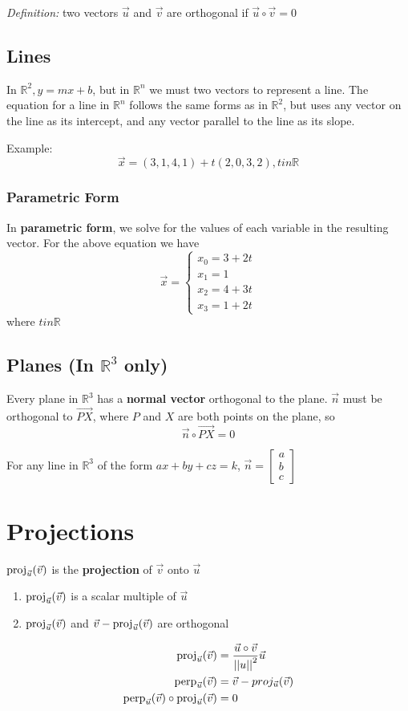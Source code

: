 \documentclass[12pt]{article}
\newcommand{\perpp}[2]{{\rm perp}_{\vec{#2}} (\vec{#1})}
\newcommand{\proj}[2]{{\rm proj}_{\vec{#2}} (\vec{#1})}
\newcommand{\R}[1]{\mathbb{R}^{#1}}
\newcommand{\vecthree}[3]{\begin{bmatrix}#1\\#2\\#3\end{bmatrix}}
\begin{document}
\textit{Definition:} two vectors $\vec{u}$ and $\vec{v}$ are orthogonal if $\vec{u}\circ\vec{v} = 0$

\subsection*{Lines}
In $\R{2}, y = mx + b$, but in $\R{n}$ we must two vectors to represent a line. The equation for a line in $\R{n}$ follows the same forms as in $\R{2}$, but uses any vector on the line as its intercept, and any vector parallel to the line as its slope.

Example: \[ \vec{x} = (3,1,4,1) + t(2,0,3,2), tin\mathbb{R} \]

\subsubsection*{Parametric Form}
In {\bf parametric form}, we solve for the values of each variable in the resulting vector. For the above equation we have
\[ \vec{x} =
  \begin{cases}
   x_0 = 3 + 2t\\
   x_1 = 1\\
   x_2 = 4 + 3t\\
   x_3 = 1 + 2t
  \end{cases}
\]
where $tin\mathbb{R}$

\subsection*{Planes (In $\R{3}$ only)}
Every plane in $\R{3}$ has a {\bf normal vector} orthogonal to the plane. $\vec{n}$ must be orthogonal to $\vec{PX}$, where $P$ and $X$ are both points on the plane, so \[ \vec{n}\circ\vec{PX}=0 \]

For any line in $\R{3}$ of the form $ax + by + cz = k$, $\vec{n} = \vecthree{a}{b}{c}$

\section*{Projections}
$\proj{v}{u}$ is the {\bf projection} of $\vec{v}$ onto $\vec{u}$
\begin{enumerate}
\item $\proj{v}{u}$ is a scalar multiple of $\vec{u}$
\item $\proj{v}{u}$ and $\vec{v} - \proj{v}{u}$ are orthogonal
\end{enumerate}

\begin{align*}
\proj{v}{u} &= \frac{\vec{u}\circ\vec{v}}{{||u||}^2}\vec{u}\\
\perpp{v}{u} &= \vec{v} - proj_{\vec{u}}(\vec{v})\\
\perpp{v}{u}\circ\proj{v}{u} &= 0
\end{align*}
\end{document}
